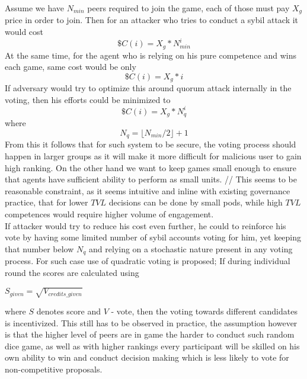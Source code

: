 \documentclass{article}
\begin{document}
\begin{CJK}{UTF8}{gbsn}
\begin{multicols}{2}
        Assume we have $N_{min}$ peers required to join the game, each of those must pay $X_g$ price in order to join. Then for an attacker who tries to conduct a sybil attack it would cost
        $$\$C(i) = X_g*N_{min}^i$$
        At the same time, for the agent who is relying on his pure competence and wins each game, same cost would be only
        $$\$C(i) = X_g*i$$
        If adversary would try to optimize this around quorum attack internally in the voting, then his efforts could be minimized to
        $$\$C(i) = X_g*N_{q}^i$$
        where
        $$N_{q} = \lfloor N_{min}/2 \rfloor+1$$
        From this it follows that for such system to be secure, the voting process should happen in larger groups as it will make it more difficult for malicious user to gain high ranking.
        On the other hand we want to keep games small enough to ensure that agents have sufficient ability to perform as small units. // This seems to be reasonable constraint, as it seems intuitive and inline with existing governance practice, that for lower $TVL$ decisions can be done by small pods, while high $TVL$ competences would require higher volume of engagement.\\
        If attacker would try to reduce his cost even further, he could to reinforce his vote by having some limited number of sybil accounts voting for him, yet keeping that number below $N_{q}$ and relying on a stochastic nature present in any voting process. For such case use of quadratic voting is proposed; If during individual round the scores are calculated using

        $S_{given}=\sqrt {V_{credits\_given}}$
        \end{multicols}
        

        \begin{multicols}{2}

        where $S$ denotes score and $V$ - vote, then the voting towards different candidates is incentivized. This still has to be observed in practice, the assumption however is that the higher level of peers are in game the harder to conduct such random dice game, as well as with higher rankings every participant will be skilled on his own ability to win and conduct decision making which is less likely to vote for non-competitive proposals.


\end{multicols}
\end{CJK}
\end{document}
